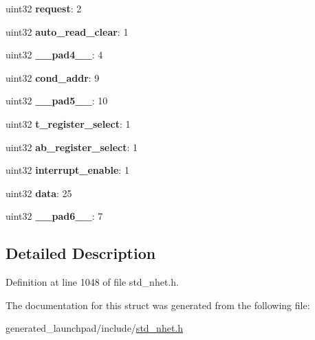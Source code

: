 \begin{DoxyCompactItemize}
\mbox{\label{structdjz__format_a13017835414e0756c2d8937069a2814a}} 
uint32 {\bfseries request}\+: 2
\item 
\mbox{\label{structdjz__format_af9d0ba64893a3b93454f7a60b69995b3}} 
uint32 {\bfseries auto\+\_\+read\+\_\+clear}\+: 1
\item 
\mbox{\label{structdjz__format_a83cdd69ceb3e4b00cc467e7f3982e941}} 
uint32 {\bfseries \+\_\+\+\_\+pad4\+\_\+\+\_\+}\+: 4
\item 
\mbox{\label{structdjz__format_aa756bb5843908776fc5477c098f542db}} 
uint32 {\bfseries cond\+\_\+addr}\+: 9
\item 
\mbox{\label{structdjz__format_a5fc7696387d6da234382476c4dab923f}} 
uint32 {\bfseries \+\_\+\+\_\+pad5\+\_\+\+\_\+}\+: 10
\item 
\mbox{\label{structdjz__format_a46e952837d2431d90779f50256218d7c}} 
uint32 {\bfseries t\+\_\+register\+\_\+select}\+: 1
\item 
\mbox{\label{structdjz__format_ac0dcc970867b7f9c0a669f268eb04a01}} 
uint32 {\bfseries ab\+\_\+register\+\_\+select}\+: 1
\item 
\mbox{\label{structdjz__format_aa236846aaaceb67d238c6b9d804fbd14}} 
uint32 {\bfseries interrupt\+\_\+enable}\+: 1
\item 
\mbox{\label{structdjz__format_a111205a07891fbc2f3a8ff36be0f18da}} 
uint32 {\bfseries data}\+: 25
\item 
\mbox{\label{structdjz__format_a4b8b9a4f0e1994bd727c138798beade4}} 
uint32 {\bfseries \+\_\+\+\_\+pad6\+\_\+\+\_\+}\+: 7
\end{DoxyCompactItemize}


\subsection{Detailed Description}


Definition at line 1048 of file std\+\_\+nhet.\+h.



The documentation for this struct was generated from the following file\+:\begin{DoxyCompactItemize}
\item 
generated\+\_\+launchpad/include/\mbox{\hyperlink{std__nhet_8h}{std\+\_\+nhet.\+h}}\end{DoxyCompactItemize}
